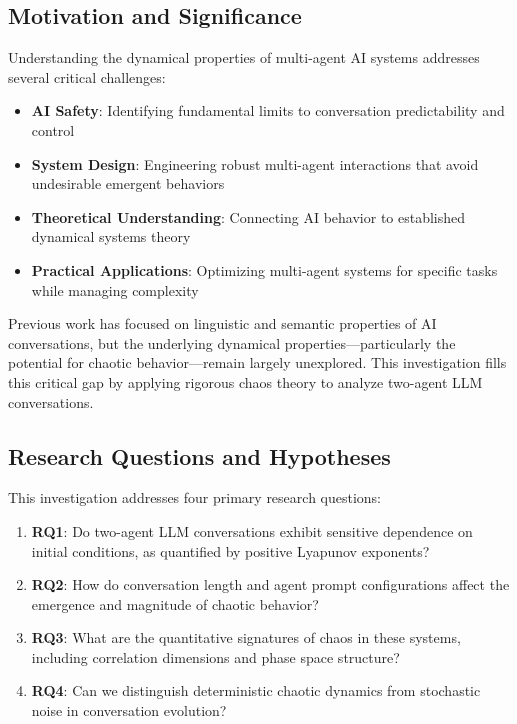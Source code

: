 \documentclass[11pt,a4paper]{article}
\begin{document}
\subsection{Motivation and Significance}

Understanding the dynamical properties of multi-agent AI systems addresses several critical challenges:

\begin{itemize}
    \item \textbf{AI Safety}: Identifying fundamental limits to conversation predictability and control
    \item \textbf{System Design}: Engineering robust multi-agent interactions that avoid undesirable emergent behaviors
    \item \textbf{Theoretical Understanding}: Connecting AI behavior to established dynamical systems theory
    \item \textbf{Practical Applications}: Optimizing multi-agent systems for specific tasks while managing complexity
\end{itemize}

Previous work has focused on linguistic and semantic properties of AI conversations, but the underlying dynamical properties—particularly the potential for chaotic behavior—remain largely unexplored. This investigation fills this critical gap by applying rigorous chaos theory to analyze two-agent LLM conversations.

\subsection{Research Questions and Hypotheses}

This investigation addresses four primary research questions:

\begin{enumerate}
    \item \textbf{RQ1}: Do two-agent LLM conversations exhibit sensitive dependence on initial conditions, as quantified by positive Lyapunov exponents?
    \item \textbf{RQ2}: How do conversation length and agent prompt configurations affect the emergence and magnitude of chaotic behavior?
    \item \textbf{RQ3}: What are the quantitative signatures of chaos in these systems, including correlation dimensions and phase space structure?
    \item \textbf{RQ4}: Can we distinguish deterministic chaotic dynamics from stochastic noise in conversation evolution?
\end{enumerate}
\end{document}
